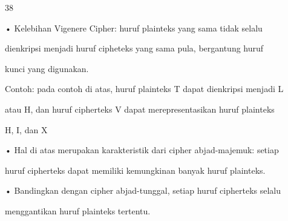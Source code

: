 \documentclass{article}
\begin{document}

38

• Kelebihan Vigenere Cipher: huruf plainteks yang sama tidak selalu 

dienkripsi menjadi huruf cipheteks yang sama pula, bergantung huruf 

kunci yang digunakan. 

 Contoh: pada contoh di atas, huruf plainteks T dapat dienkripsi menjadi L 

atau H,  dan huruf cipherteks V dapat merepresentasikan huruf plainteks 

H, I, dan X 

• Hal di atas merupakan karakteristik dari cipher abjad-majemuk: setiap 

huruf cipherteks dapat memiliki kemungkinan banyak huruf plainteks. 

• Bandingkan dengan cipher abjad-tunggal, setiap huruf cipherteks selalu 

menggantikan huruf plainteks tertentu.
\end{document}
